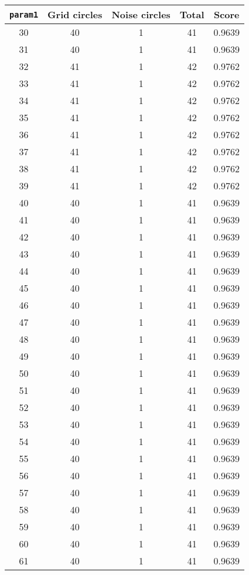 \documentclass[letterpaper, 12pt]{article}
\begin{document}
\begin{longtable}{|c|c|c|c|c|}
\hline
\textbf{\texttt{param1}} & \textbf{Grid circles} & \textbf{Noise circles} & \textbf{Total} & \textbf{Score} \\
\hline
30 & 40 & 1 & 41 & 0.9639 \\
\hline
31 & 40 & 1 & 41 & 0.9639 \\
\hline
32 & 41 & 1 & 42 & 0.9762 \\
\hline
33 & 41 & 1 & 42 & 0.9762 \\
\hline
34 & 41 & 1 & 42 & 0.9762 \\
\hline
35 & 41 & 1 & 42 & 0.9762 \\
\hline
36 & 41 & 1 & 42 & 0.9762 \\
\hline
37 & 41 & 1 & 42 & 0.9762 \\
\hline
38 & 41 & 1 & 42 & 0.9762 \\
\hline
39 & 41 & 1 & 42 & 0.9762 \\
\hline
40 & 40 & 1 & 41 & 0.9639 \\
\hline
41 & 40 & 1 & 41 & 0.9639 \\
\hline
42 & 40 & 1 & 41 & 0.9639 \\
\hline
43 & 40 & 1 & 41 & 0.9639 \\
\hline
44 & 40 & 1 & 41 & 0.9639 \\
\hline
45 & 40 & 1 & 41 & 0.9639 \\
\hline
46 & 40 & 1 & 41 & 0.9639 \\
\hline
47 & 40 & 1 & 41 & 0.9639 \\
\hline
48 & 40 & 1 & 41 & 0.9639 \\
\hline
49 & 40 & 1 & 41 & 0.9639 \\
\hline
50 & 40 & 1 & 41 & 0.9639 \\
\hline
51 & 40 & 1 & 41 & 0.9639 \\
\hline
52 & 40 & 1 & 41 & 0.9639 \\
\hline
53 & 40 & 1 & 41 & 0.9639 \\
\hline
54 & 40 & 1 & 41 & 0.9639 \\
\hline
55 & 40 & 1 & 41 & 0.9639 \\
\hline
56 & 40 & 1 & 41 & 0.9639 \\
\hline
57 & 40 & 1 & 41 & 0.9639 \\
\hline
58 & 40 & 1 & 41 & 0.9639 \\
\hline
59 & 40 & 1 & 41 & 0.9639 \\
\hline
60 & 40 & 1 & 41 & 0.9639 \\
\hline
61 & 40 & 1 & 41 & 0.9639 \\

\end{longtable}
\end{document}
